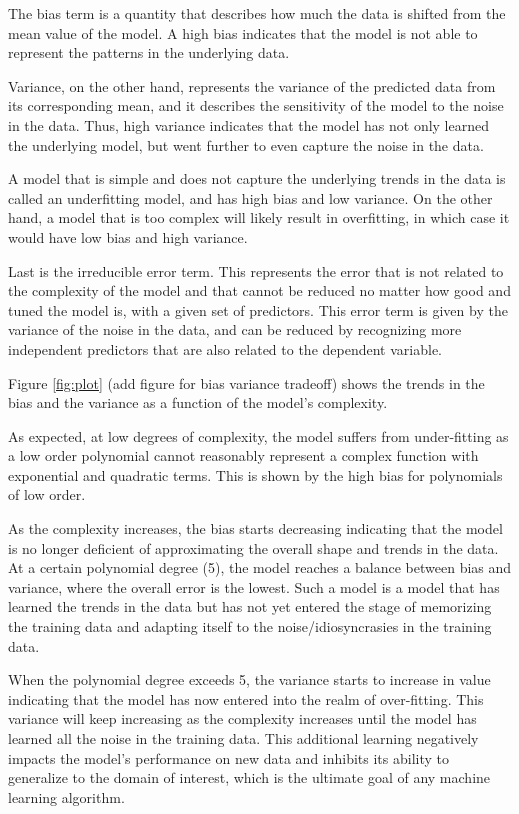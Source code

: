 \documentclass{article}
\begin{document}
The bias term is a quantity that describes how much the data is shifted from the mean value of the model. A high bias indicates that the model is not able to represent the patterns in the underlying data.

Variance, on the other hand, represents the variance of the predicted data from its corresponding mean, and it describes the sensitivity of the model to the noise in the data. Thus, high variance indicates that the model has not only learned the underlying model, but went further to even capture the noise in the data.

A model that is simple and does not capture the underlying trends in the data is called an underfitting model, and has high bias and low variance. On the other hand, a model that is too complex will likely result in overfitting, in which case it would have low bias and high variance.

Last is the irreducible error term. This represents the error that is not related to the complexity of the model and that cannot be reduced no matter how good and tuned the model is, with a given set of predictors. This error term is given by the variance of the noise in the data, and can be reduced by recognizing more independent predictors that are also related to the dependent variable.

Figure \ref{fig:plot} (add figure for bias variance tradeoff) shows the trends in the bias and the variance as a function of the model’s complexity. 

As expected, at low degrees of complexity, the model suffers from under-fitting as a low order polynomial cannot reasonably represent a complex function with exponential and quadratic terms. This is shown by the high bias for polynomials of low order.

As the complexity increases, the bias starts decreasing indicating that the model is no longer deficient of approximating the overall shape and trends in the data. At a certain polynomial degree (5), the model reaches a balance between bias and variance, where the overall error is the lowest. Such a model is a model that has learned the trends in the data but has not yet entered the stage of memorizing the training data and adapting itself to the noise/idiosyncrasies in the training data.

When the polynomial degree exceeds 5, the variance starts to increase in value indicating that the model has now entered into the realm of over-fitting. This variance will keep increasing as the complexity increases until the model has learned all the noise in the training data. This additional learning negatively impacts the model’s performance on new data and inhibits its ability to generalize to the domain of interest, which is the ultimate goal of any machine learning algorithm.
\end{document}
